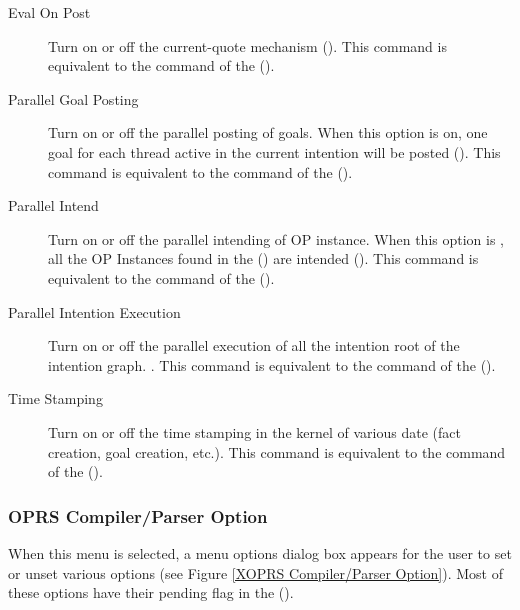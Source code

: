 \begin{description}

\item[Eval On Post] Turn on or off the current-quote mechanism
(). This command is equivalent to the  command of the \CPK{} ().

\item[Parallel Goal Posting] Turn on or off the parallel posting of goals. When
this option is on, one goal for each thread active in the current intention
will be posted (). This command is
equivalent to the  command of the \CPK{}
().

\item[Parallel Intend] Turn on or off the parallel intending of OP instance.
When this option is , all the OP Instances found in the
 () are intended
(). This command is equivalent to the  command of the \CPK{} (). 

\item[Parallel Intention Execution] Turn on or off the parallel execution of
all the intention root of the intention graph. . This command is equivalent to the  command of the \CPK{} ().

\item[Time Stamping] Turn on or off the time stamping in the kernel of various
date (fact creation, goal creation, etc.). This command is equivalent to the
 command of the \CPK{} (). 

\end{description}

\subsubsection{OPRS Compiler/Parser Option}


When this menu is selected, a menu options dialog box appears for the user to
set or unset various options (see Figure \ref{XOPRS Compiler/Parser Option}). Most of these
options have their pending flag in the \CPK{} ().

